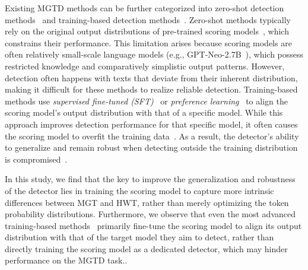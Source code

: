 Existing MGTD methods can be further categorized into zero-shot detection methods~\cite{entropy, lrrandnpr, detectgpt, fastdetectgpt, hart} and training-based detection methods~\cite{logrank, imbd}.
%
%
Zero-shot methods typically rely on the original output distributions of pre-trained scoring models~\cite{glimpse}, which constrains their performance. This limitation arises because scoring models are often relatively small-scale language models (e.g., GPT-Neo-2.7B~\cite{gpt-neo}), which possess restricted knowledge and comparatively simplistic output patterns. However, detection often happens with texts that deviate from their inherent distribution, making it difficult for these methods to realize reliable detection.
%
Training-based methods use \textit{supervised fine-tuned (SFT)}~\cite{sft, logrank} or \textit{preference learning}~\cite{orpo, dpo, imbd} to align the scoring model's output distribution with that of a specific model.
%
While this approach improves detection performance for that specific model, it often causes the scoring model to overfit the training data~\cite{overfit, outdomain}. As a result, the detector's ability to generalize and remain robust when detecting outside the training distribution is compromised~\cite{fastdetectgpt, survey_necessity_methods_futuredirect, survey_science}. %

In this study, we find that the key to improve the generalization and robustness of the detector lies in training the scoring model to capture more intrinsic differences between MGT and HWT, rather than merely optimizing the token probability distributions.
%
Furthermore, we observe that even the most advanced training-based methods~\cite{imbd, pawn} primarily fine-tune the scoring model to align its output distribution with that of the target model they aim to detect, rather than directly training the scoring model as a dedicated detector, which may hinder performance on the MGTD task..

